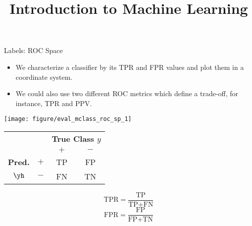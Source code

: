 \documentclass[11pt,compress,t,notes=noshow, xcolor=table]{beamer}
\title{Introduction to Machine Learning}
\institute{\href{https://compstat-lmu.github.io/lecture_i2ml/}{compstat-lmu.github.io/lecture\_i2ml}}
\date{}
\newenvironment{knitrout}{}{} %
\begin{document}







\begin{vbframe}{Labels: ROC Space}

\begin{itemize}
 \item We characterize a classifier by its TPR and FPR values and plot them in 
 a coordinate system.
 \item We could also use two different ROC metrics which define a trade-off, 
 for instance, TPR and PPV.
\end{itemize}

\lz

\begin{minipage}[c]{0.5\textwidth}
  \begin{knitrout}
    \scriptsize
    \color{fgcolor}
    {\centering \texttt{[image: figure/eval\_mclass\_roc\_sp\_1]}}
  \end{knitrout}
\end{minipage}%
\begin{minipage}[c]{0.5\textwidth}
\begin{center}
  \small
  \begin{tabular}{cc|cc}
    & & \multicolumn{2}{c}{\bfseries True Class $y$} \\
    & & $+$ & $-$ \\
    \hline
    \bfseries Pred.     & $+$ & TP & FP \\
              $\yh$ & $-$ & FN & TN \\
\end{tabular}
\lz
$$\text{TPR} = \frac{\text{TP}}{\text{TP} + \text{FN}}$$
$$\text{FPR} = \frac{\text{FP}}{\text{FP} + \text{TN}}$$
\end{center}
\end{minipage}

\end{vbframe}
\end{document}

